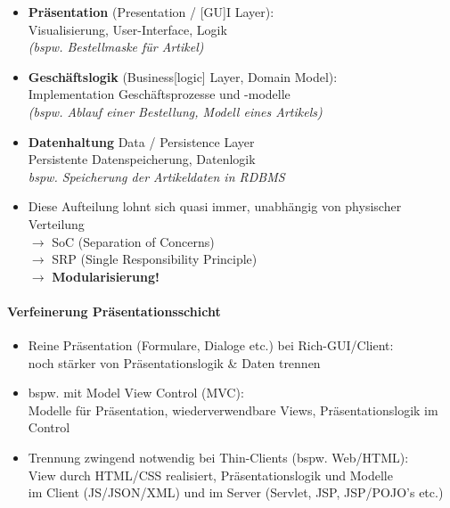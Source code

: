 \documentclass[a4paper]{article}
\begin{document}
			\begin{itemize}
				\item \textbf{Präsentation} (Presentation / [GU]I Layer):\\
						Visualisierung, User-Interface, Logik\\
						\textit{(bspw. Bestellmaske für Artikel)}
						
				\item \textbf{Geschäftslogik} (Business[logic] Layer, Domain Model):\\
						Implementation Geschäftsprozesse und -modelle\\
						\textit{(bspw. Ablauf einer Bestellung, Modell eines Artikels)}
						
				\item \textbf{Datenhaltung} {Data / Persistence Layer}\\
						Persistente Datenspeicherung, Datenlogik\\
						\textit{bspw. Speicherung der Artikeldaten in RDBMS}\\
						
				\item Diese Aufteilung lohnt sich quasi immer, unabhängig von physischer Verteilung\\
				$\rightarrow$ SoC (Separation of Concerns)\\
				$\rightarrow$ SRP (Single Responsibility Principle)\\
				$\rightarrow$ \textbf{Modularisierung!}				
			\end{itemize}
		
				\paragraph{Verfeinerung Präsentationsschicht}
				
					\begin{itemize}
						\item Reine Präsentation (Formulare, Dialoge etc.) bei Rich-GUI/Client:\\ 
						noch stärker von Präsentationslogik \& Daten trennen
						
						\item bspw. mit Model View Control (MVC):\\
						Modelle für Präsentation, wiederverwendbare Views, Präsentationslogik im Control
						
						\item Trennung zwingend notwendig bei Thin-Clients (bspw. Web/HTML):\\
						View durch HTML/CSS realisiert, Präsentationslogik und Modelle\\
						im Client (JS/JSON/XML) und im Server (Servlet, JSP, JSP/POJO's etc.)
					\end{itemize}
				
\end{document}
